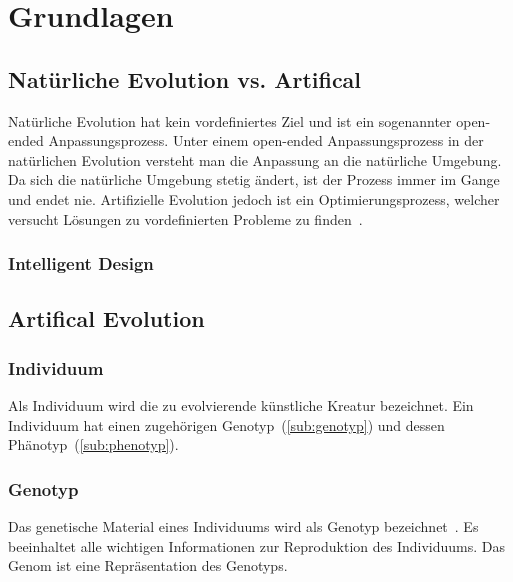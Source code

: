 %
%


\chapter{Grundlagen}

\section{Natürliche Evolution vs. Artifical}

  Natürliche Evolution hat kein vordefiniertes Ziel und ist ein sogenannter open-ended Anpassungsprozess.
  Unter einem open-ended Anpassungsprozess in der natürlichen Evolution versteht man die Anpassung an die natürliche Umgebung.
  Da sich die natürliche Umgebung stetig ändert, ist der Prozess immer im Gange und endet nie.
  Artifizielle Evolution jedoch ist ein Optimierungsprozess,
  welcher versucht Lösungen zu vordefinierten Probleme zu finden~\cite[S.1]{book:bioInspired}.

  \subsection{Intelligent Design\label{sub:IntelligentDesign}}


\section{Artifical Evolution}

    \subsection{Individuum\label{sub:individual}}
      Als Individuum wird die zu evolvierende künstliche Kreatur bezeichnet.
      Ein Individuum hat einen zugehörigen Genotyp~(\vref{sub:genotyp}) und dessen Phänotyp~(\vref{sub:phenotyp}).
    \subsection{Genotyp\label{sub:genotyp}}
        Das genetische Material eines Individuums wird als Genotyp bezeichnet~\cite[S.5]{book:bioInspired}.
        Es beeinhaltet alle wichtigen Informationen zur Reproduktion des Individuums.
        Das Genom ist eine Repräsentation des Genotyps.
